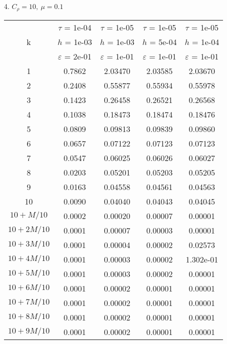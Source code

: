 4. $C_{\rho} = 10, \ \mu = 0.1$
\begin{center}
	\begin{tabular}{ |c|c|c|c|c| } 
		\hline
		& $\tau$ = 1e-04 & $\tau$ = 1e-05 & $\tau$ = 1e-05 & $\tau$ = 1e-05 \\ 
		k & $h$ = 1e-03 & $h$ = 1e-03 & $h$ = 5e-04 & $h$ = 1e-04 \\ 
		& $\varepsilon$ = 2e-01 & $\varepsilon$ = 1e-01 & $\varepsilon$ = 1e-01 & $\varepsilon$ = 1e-01 \\ 
		\hline
		1 & 0.7862 & 2.03470 & 2.03585 & 2.03670 \\
		\hline
		2 & 0.2408 & 0.55877 & 0.55934 & 0.55978 \\
		\hline
		3 & 0.1423 & 0.26458 & 0.26521 & 0.26568 \\
		\hline
		4 & 0.1038 & 0.18473 & 0.18474 & 0.18476 \\
		\hline
		5 & 0.0809 & 0.09813 & 0.09839 & 0.09860 \\
		\hline
		6 & 0.0657 & 0.07122 & 0.07123 & 0.07123 \\
		\hline
		7 & 0.0547 & 0.06025 & 0.06026 & 0.06027 \\
		\hline
		8 & 0.0203 & 0.05201 & 0.05203 & 0.05205 \\
		\hline
		9 & 0.0163 & 0.04558 & 0.04561 & 0.04563 \\
		\hline
		10 & 0.0090 & 0.04040 & 0.04043 & 0.04045 \\
		\hline
		$10 + M/10$ & 0.0002 & 0.00020 & 0.00007 & 0.00001 \\
		\hline
		$10 + 2M/10$ & 0.0001 & 0.00007 & 0.00003 & 0.00001 \\
		\hline
		$10 + 3M/10$ & 0.0001 & 0.00004 & 0.00002 & 0.02573 \\
		\hline
		$10 + 4M/10$ & 0.0001 & 0.00003 & 0.00002 & 1.302e-01 \\
		\hline
		$10 + 5M/10$ & 0.0001 & 0.00003 & 0.00002 & 0.00001 \\
		\hline
		$10 + 6M/10$ & 0.0001 & 0.00002 & 0.00001 & 0.00001 \\
		\hline
		$10 + 7M/10$ & 0.0001 & 0.00002 & 0.00001 & 0.00001 \\
		\hline
		$10 + 8M/10$ & 0.0001 & 0.00002 & 0.00001 & 0.00001 \\
		\hline
		$10 + 9M/10$ & 0.0001 & 0.00002 & 0.00001 & 0.00001 \\
		\hline
	\end{tabular}
\end{center}


